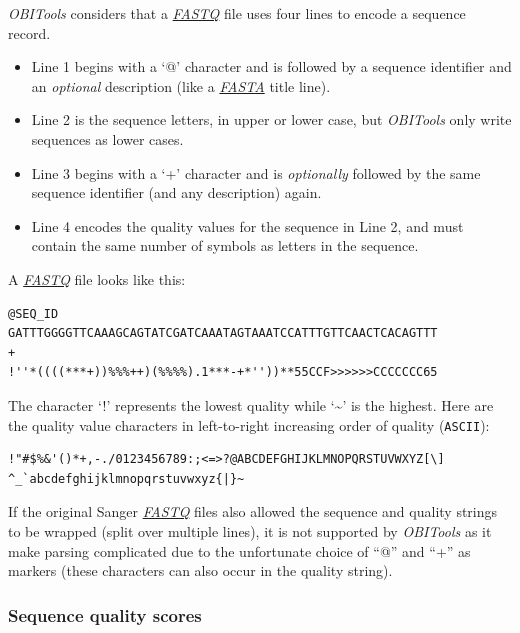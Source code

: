\documentclass[
  letterpaper,
  DIV=11,
  numbers=noendperiod]{scrreprt}
\providecommand{\tightlist}{%
  \setlength{\itemsep}{0pt}\setlength{\parskip}{0pt}}\usepackage{longtable,booktabs,array}
\begin{document}
\emph{OBITools} considers that a
\protect\hyperlink{sec-fastq}{\emph{FASTQ}} file uses four lines to
encode a sequence record.

\begin{itemize}
\tightlist
\item
  Line 1 begins with a `@' character and is followed by a sequence
  identifier and an \emph{optional} description (like a
  \protect\hyperlink{sec-fasta}{\emph{FASTA}} title line).
\item
  Line 2 is the sequence letters, in upper or lower case, but
  \emph{OBITools} only write sequences as lower cases.
\item
  Line 3 begins with a `+' character and is \emph{optionally} followed
  by the same sequence identifier (and any description) again.
\item
  Line 4 encodes the quality values for the sequence in Line 2, and must
  contain the same number of symbols as letters in the sequence.
\end{itemize}

A \protect\hyperlink{sec-fastq}{\emph{FASTQ}} file looks like this:

\begin{verbatim}
@SEQ_ID
GATTTGGGGTTCAAAGCAGTATCGATCAAATAGTAAATCCATTTGTTCAACTCACAGTTT
+
!''*((((***+))%%%++)(%%%%).1***-+*''))**55CCF>>>>>>CCCCCCC65
\end{verbatim}

The character `!' represents the lowest quality while
`\textasciitilde{}' is the highest. Here are the quality value
characters in left-to-right increasing order of quality
(\texttt{ASCII}):

\begin{verbatim}
!"#$%&'()*+,-./0123456789:;<=>?@ABCDEFGHIJKLMNOPQRSTUVWXYZ[\]
^_`abcdefghijklmnopqrstuvwxyz{|}~
\end{verbatim}

If the original Sanger \protect\hyperlink{sec-fastq}{\emph{FASTQ}} files
also allowed the sequence and quality strings to be wrapped (split over
multiple lines), it is not supported by \emph{OBITools} as it make
parsing complicated due to the unfortunate choice of ``@'' and ``+'' as
markers (these characters can also occur in the quality string).

\hypertarget{sequence-quality-scores}{%
\subsubsection*{Sequence quality scores}\label{sequence-quality-scores}}
\end{document}
